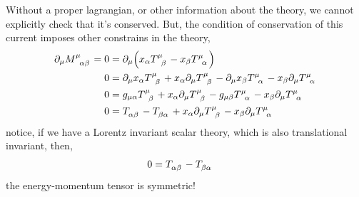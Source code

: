 Without a proper lagrangian, or other information about the theory, we cannot explicitly check that it's conserved. But, the 
condition of conservation of this current imposes other constrains in the theory,
\begin{align}
    \partial_\mu \tensor{M}{^\mu_\alpha_\beta}=0&= \partial_\mu\qty(x_\alpha \tensor{T}{^\mu_\beta}-x_\beta \tensor{T}{^\mu_\alpha})\\
    0&= \partial_\mu x_\alpha \tensor{T}{^\mu_\beta}+x_\alpha\partial_\mu \tensor{T}{^\mu_\beta}-\partial_\mu x_\beta \tensor{T}{^\mu_\alpha}- x_\beta\partial_\mu \tensor{T}{^\mu_\alpha}\\
    0&= g_{\mu\alpha} \tensor{T}{^\mu_\beta}+x_\alpha\partial_\mu \tensor{T}{^\mu_\beta}-g_{\mu\beta} \tensor{T}{^\mu_\alpha}- x_\beta\partial_\mu \tensor{T}{^\mu_\alpha}\\
    0&= \tensor{T}{_\alpha_\beta}-\tensor{T}{_\beta_\alpha}+x_\alpha\partial_\mu \tensor{T}{^\mu_\beta}- x_\beta\partial_\mu \tensor{T}{^\mu_\alpha}
\end{align}
notice, if we have a Lorentz invariant scalar theory, which is also translational invariant, then, 
\begin{align}
    0&= \tensor{T}{_\alpha_\beta}-\tensor{T}{_\beta_\alpha}
\end{align}
the energy-momentum tensor is symmetric!
